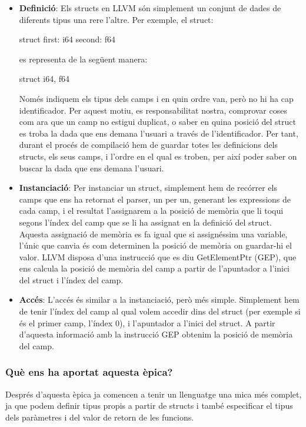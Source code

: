 ﻿\documentclass{article}
\begin{document}
\begin{itemize}
\item \textbf{Definició}: Els structs en LLVM són simplement un conjunt
    de dades de diferents tipus una rere l'altre. Per exemple, el struct:

    \begin{code}
        struct {
            first: i64
            second: f64
        }
    \end{code}

    es representa de la següent manera:

    \begin{code}
        struct { i64, f64 }
    \end{code}

    Només indiquem els tipus dels camps i en quin ordre van, però no hi ha cap
    identificador. Per aquest motiu, es responsabilitat nostra, comprovar coses
    com ara que un camp no estigui duplicat, o saber en quina posició del struct
    es troba la dada que ens demana l'usuari a través de l'identificador. Per
    tant, durant el procés de compilació hem de guardar totes les definicions
    dels structs, els seus camps, i l'ordre en el qual es troben, per així poder
    saber on buscar la dada que ens demana l'usuari.

\item \textbf{Instanciació}: Per instanciar un struct, simplement hem de recórrer
    els camps que ens ha retornat el parser, un per un, generant les expressions
    de cada camp, i el resultat l'assignarem a la posició de memòria que li
    toqui segons l'índex del camp que se li ha assignat en la definició del
    struct. Aquesta assignació de memòria es fa igual que si assignéssim una
    variable, l'únic que canvia és com determinen la posició de memòria on
    guardar-hi el valor. LLVM disposa d'una instrucció que es diu GetElementPtr
    (GEP), que ens calcula la posició de memòria del camp a partir de
    l'apuntador a l'inici del struct i l'índex del camp.

\item \textbf{Accés}: L'accés és similar a la instanciació, però més simple.
    Simplement hem de tenir l'índex del camp al qual volem accedir dins del
    struct (per exemple si és el primer camp, l'índex 0), i l'apuntador a
    l'inici del struct. A partir d'aquesta informació amb la instrucció GEP
    obtenim la posició de memòria del camp.
\end{itemize}

\subsubsection{Què ens ha aportat aquesta èpica?}
Després d'aquesta èpica ja comencen a tenir un llenguatge una mica més complet,
ja que podem definir tipus propis a partir de structs i també especificar el tipus
dels paràmetres i del valor de retorn de les funcions.
\end{document}
